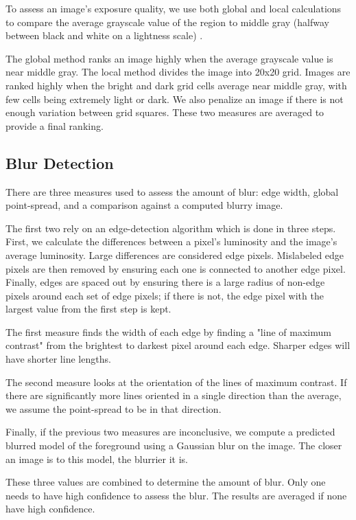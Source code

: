 \documentclass{sig-alternate}
\begin{document}
To assess an image's exposure quality, we use both global and local calculations to compare the average grayscale value of the region to middle gray (halfway between black and white on a lightness scale) \cite{ppr:1815}.

The global method ranks an image highly when the average grayscale value is near middle gray. The local method divides the image into 20x20 grid. Images are ranked highly when the bright and dark grid cells average near middle gray, with few cells being extremely light or dark. We also penalize an image if there is not enough variation between grid squares. These two measures are averaged to provide a final ranking.

\subsection{Blur Detection}
There are three measures used to assess the amount of blur: edge width, global point-spread, and a comparison against a computed blurry image.

The first two rely on an edge-detection algorithm which is done in three steps. First, we calculate the differences between a pixel's luminosity and the image's average luminosity. Large differences are considered edge pixels. Mislabeled edge pixels are then removed by ensuring each one is connected to another edge pixel. Finally, edges are spaced out by ensuring there is a large radius of non-edge pixels around each set of edge pixels; if there is not, the edge pixel with the largest value from the first step is kept. %

The first measure finds the width of each edge by finding a "line of maximum contrast" from the brightest to darkest pixel around each edge. Sharper edges will have shorter line lengths.

The second measure looks at the orientation of the lines of maximum contrast. If there are significantly more lines oriented in a single direction than the average, we assume the point-spread to be in that direction. %

Finally, if the previous two measures are inconclusive, we compute a predicted blurred model of the foreground using a Gaussian blur on the image. The closer an image is to this model, the blurrier it is.

These three values are combined to determine the amount of blur. Only one needs to have high confidence to assess the blur. The results are averaged if none have high confidence.%
\end{document}
